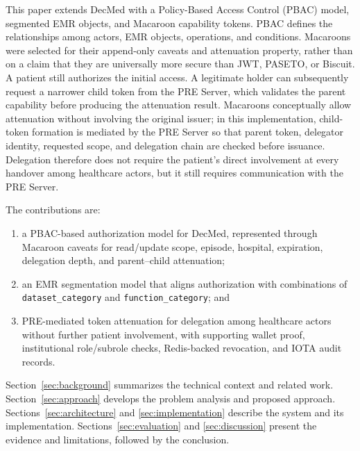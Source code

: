 This paper extends DecMed with a Policy-Based Access Control (PBAC) model, segmented EMR objects, and Macaroon capability tokens. PBAC defines the relationships among actors, EMR objects, operations, and conditions. Macaroons were selected for their append-only caveats and attenuation property, rather than on a claim that they are universally more secure than JWT, PASETO, or Biscuit. A patient still authorizes the initial access. A legitimate holder can subsequently request a narrower child token from the PRE Server, which validates the parent capability before producing the attenuation result. Macaroons conceptually allow attenuation without involving the original issuer; in this implementation, child-token formation is mediated by the PRE Server so that parent token, delegator identity, requested scope, and delegation chain are checked before issuance. Delegation therefore does not require the patient's direct involvement at every handover among healthcare actors, but it still requires communication with the PRE Server.

The contributions are:
\begin{enumerate}
	\item a PBAC-based authorization model for DecMed, represented through Macaroon caveats for read/update scope, episode, hospital, expiration, delegation depth, and parent--child attenuation;
	\item an EMR segmentation model that aligns authorization with combinations of \texttt{dataset\_category} and \texttt{function\_category}; and
	\item PRE-mediated token attenuation for delegation among healthcare actors without further patient involvement, with supporting wallet proof, institutional role/subrole checks, Redis-backed revocation, and IOTA audit records.
\end{enumerate}

Section~\ref{sec:background} summarizes the technical context and related work. Section~\ref{sec:approach} develops the problem analysis and proposed approach. Sections~\ref{sec:architecture} and \ref{sec:implementation} describe the system and its implementation. Sections~\ref{sec:evaluation} and \ref{sec:discussion} present the evidence and limitations, followed by the conclusion.
